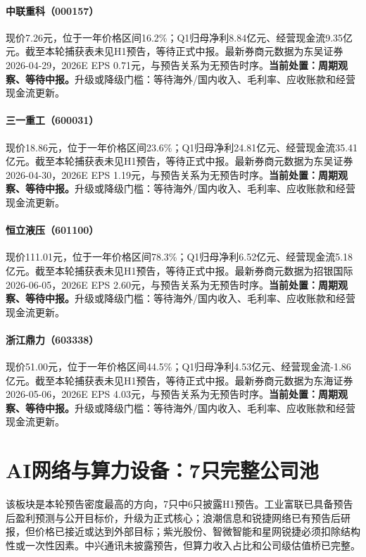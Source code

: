 \paragraph{中联重科（000157）}
现价7.26元，位于一年价格区间16.2\%；Q1归母净利8.84亿元、经营现金流9.35亿元。截至本轮捕获表未见H1预告，等待正式中报。最新券商元数据为东吴证券 2026-04-29，2026E EPS 0.71元，与预告关系为无预告时序。\textbf{当前处置：周期观察、等待中报。}升级或降级门槛：等待海外/国内收入、毛利率、应收账款和经营现金流更新。

\paragraph{三一重工（600031）}
现价18.86元，位于一年价格区间23.6\%；Q1归母净利24.81亿元、经营现金流35.41亿元。截至本轮捕获表未见H1预告，等待正式中报。最新券商元数据为东吴证券 2026-04-30，2026E EPS 1.19元，与预告关系为无预告时序。\textbf{当前处置：周期观察、等待中报。}升级或降级门槛：等待海外/国内收入、毛利率、应收账款和经营现金流更新。

\paragraph{恒立液压（601100）}
现价111.01元，位于一年价格区间78.3\%；Q1归母净利6.52亿元、经营现金流5.18亿元。截至本轮捕获表未见H1预告，等待正式中报。最新券商元数据为招银国际 2026-06-05，2026E EPS 2.60元，与预告关系为无预告时序。\textbf{当前处置：周期观察、等待中报。}升级或降级门槛：等待海外/国内收入、毛利率、应收账款和经营现金流更新。

\paragraph{浙江鼎力（603338）}
现价51.00元，位于一年价格区间44.5\%；Q1归母净利4.53亿元、经营现金流-1.86亿元。截至本轮捕获表未见H1预告，等待正式中报。最新券商元数据为东海证券 2026-05-06，2026E EPS 4.03元，与预告关系为无预告时序。\textbf{当前处置：周期观察、等待中报。}升级或降级门槛：等待海外/国内收入、毛利率、应收账款和经营现金流更新。


\section{AI网络与算力设备：7只完整公司池}

该板块是本轮预告密度最高的方向，7只中6只披露H1预告。工业富联已具备预告后盈利预测与公开目标价，升级为正式核心；浪潮信息和锐捷网络已有预告后研报，但价格已接近或达到外部目标；紫光股份、智微智能和星网锐捷必须扣除结构性或一次性因素。中兴通讯未披露预告，但算力收入占比和公司级估值桥已完整。


